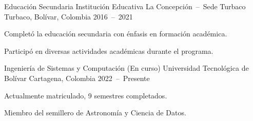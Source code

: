 

\begin{cventries}
  \cventry
    {Educación Secundaria}
    {Institución Educativa La Concepción~--~Sede Turbaco}
    {Turbaco, Bolívar, Colombia}
    {2016~--~2021}
    {
      \begin{cvitems}
        \item {Completó la educación secundaria con énfasis en formación académica.}
        \item {Participó en diversas actividades académicas durante el programa.}
      \end{cvitems}
    }
\end{cventries}

\smallskip

\begin{cventries}
  \cventry
    {Ingeniería de Sistemas y Computación (En curso)}
    {Universidad Tecnológica de Bolívar}
    {Cartagena, Colombia}
    {2022~--~Presente}
    {
      \begin{cvitems}
        \item {Actualmente matriculado, 9 semestres completados.}
        \item {Miembro del semillero de Astronomía y Ciencia de Datos.}
      \end{cvitems}
    }
\end{cventries}


    
    
